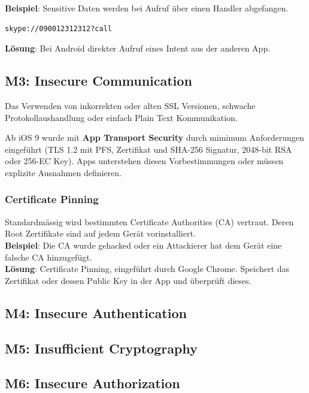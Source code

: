 \textbf{Beispiel}: Sensitive Daten werden bei Aufruf über einen Handler abgefangen.
\begin{lstlisting}[language=XML, caption=Aufruf von Skype]
skype://090012312312?call
\end{lstlisting}

\textbf{Lösung}: Bei Android direkter Aufruf eines Intent aus der anderen App.

\subsection{M3: Insecure Communication}
Das Verwenden von inkorrekten oder alten SSL Versionen, schwache Protokollaushandlung oder einfach Plain Text Kommunikation.

Ab iOS 9 wurde mit \textbf{App Transport Security} durch mimimum Anforderungen eingeführt (TLS 1.2 mit PFS, Zertifikat und SHA-256 Signatur, 2048-bit RSA oder 256-EC Key). Apps unterstehen diesen Vorbestimmungen oder müssen explizite Ausnahmen definieren.

\subsubsection{Certificate Pinning}
Standardmässig wird bestimmten Certificate Authorities (CA) vertraut. Deren Root Zertifikate sind auf jedem Gerät vorinstalliert.\\

\textbf{Beispiel}: Die CA wurde gehacked oder ein Attackierer hat dem Gerät eine falsche CA hinzugefügt. \\

\textbf{Lösung}: Certificate Pinning, eingeführt durch Google Chrome. Speichert das Zertifikat oder dessen Public Key in der App und überprüft dieses.

\subsection{M4: Insecure Authentication}

\subsection{M5: Insufficient Cryptography}

\subsection{M6: Insecure Authorization}

